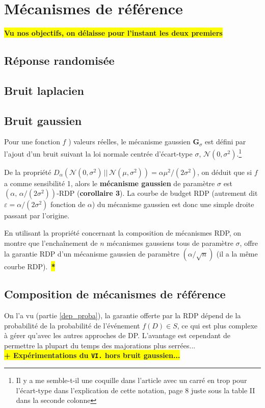 \documentclass[a4paper,11pt]{article} %
\newcommand{\ttt}[1]{\texttt{#1}}
\newcommand{\rem}[1]{\colorbox{yellow}{\textbf{#1}}}
\newcommand{\REM}[1]{\colorbox{yellow}{\color{red}\textbf{#1}}}
\begin{document}
\section{Mécanismes de référence}
\rem{Vu nos objectifs, on délaisse pour l'instant les deux premiers}%
%
\subsection{Réponse randomisée}
%
%
\subsection{Bruit laplacien}
%
%
\subsection{Bruit gaussien}
%
Pour une fonction $f$ ) valeurs réelles, le mécanisme gaussien $\mathbf{G}_\sigma$ est défini par l'ajout d'un bruit suivant la loi normale centrée d'écart-type $\sigma$, $\mathcal{N}(0,\sigma^2)$.\footnote{Il y a me semble-t-il une coquille dans l'article avec un carré en trop pour l'écart-type dans l'explication de cette notation, page 8 juste sous la table II dans la seconde colonne}

De la propriété $D_\alpha(\mathcal{N}(0,\sigma^2)\,||\, \mathcal{N}(\mu,\sigma^2)) = \alpha \mu^2 / (2\sigma^2)$, on déduit que si $f$ a comme sensibilité 1, alors le \textbf{mécanisme gaussien} de paramètre $\sigma$ est $(\alpha,\, \alpha/(2\sigma^2))$-RDP (\textbf{corollaire 3}). La courbe de budget RDP (autrement dit $\varepsilon = \alpha/(2\sigma^2)$ fonction de $\alpha$) du mécanisme gaussien est donc une simple droite passant par l'origine.

En utilisant la propriété concernant la composition de mécanismes RDP, on montre que l'enchaînement de $n$ mécanismes gaussiens tous de paramètre $\sigma$, offre la garantie RDP d'un mécanisme gaussien de paramètre $(\alpha/\sqrt{n})$ (il a la même courbe RDP).~\REM{*}%

%
\subsection{Composition de mécanismes de référence}
%
On l'a vu (partie \ref{dep_proba}), la garantie offerte par la RDP dépend de la probabilité de la probabilité de l'événement $f(D)\in S$, ce qui est plus complexe à gérer qu'avec les autres approches de DP. L'avantage est cependant de permettre la plupart du temps des majorations plus serrées...\\
\rem{+ Expérimentations du \ttt{VI.} hors bruit gaussien...}
\end{document}
